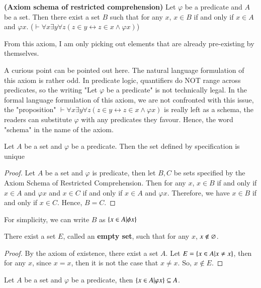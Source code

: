 \begin{ax}
    \textbf{(Axiom schema of restricted comprehension)} Let $\varphi$ be a predicate and $A$ be a set. Then there exist a set $B$ such that for any $x$, $x\in B$ if and only if $x\in A$ and $\varphi x$. ($\vdash \forall x\exists y\forall z(z\in y\leftrightarrow z\in x\wedge \varphi x)$)
\end{ax}
From this axiom, I am only picking out elements that are already pre-existing by themselves.\\
\begin{rem}
    A curious point can be pointed out here. The natural language formulation of this axiom is rather odd. In predicate logic, quantifiers do NOT range across predicates, so the writing "Let $\varphi$ be a predicate" is not technically legal. In the formal language formulation of this axiom, we are not confronted with this issue, the "proposition" $\vdash \forall x\exists y\forall z(z\in y\leftrightarrow z\in x\wedge \varphi x)$ is really left as a schema, the readers can substitute $\varphi$ with any predicates they favour. Hence, the word "schema" in the name of the axiom.
\end{rem}
\begin{prop}
    Let $A$ be a set and $\varphi$ be a predicate. Then the set defined by specification is unique
\end{prop}
\begin{proof}
    Let $A$ be a set and $\varphi$ is predicate, then let $B,C$ be sets specified by the Axiom Schema of Restricted Comprehension. Then for any $x$, $x\in B$ if and only if $x\in A$ and $\varphi x$ and $x\in C$ if and only if $x\in A$ and $\varphi x$. Therefore, we have $x\in B$ if and only if $x\in C$. Hence, $B=C$.
\end{proof}
\begin{rem}
    For simplicity, we can write $B$ as $\{x\in A|\phi x\}$
\end{rem}
\begin{thm}
    There exist a set $E$, called an \textbf{empty set}, such that for any $x$, $x\not\in \varnothing$. 
\end{thm}
\begin{proof}
    By the axiom of existence, there exist a set $A$. Let $E = \{x\in A|x\neq x\}$, then for any $x$, since $x=x$, then it is not the case that $x\neq x$. So, $x\not\in E$.
\end{proof}
\begin{prop}
    Let $A$ be a set and $\varphi$ be a predicate, then $\{x\in A|\varphi x\}\subseteq A$.
\end{prop}
